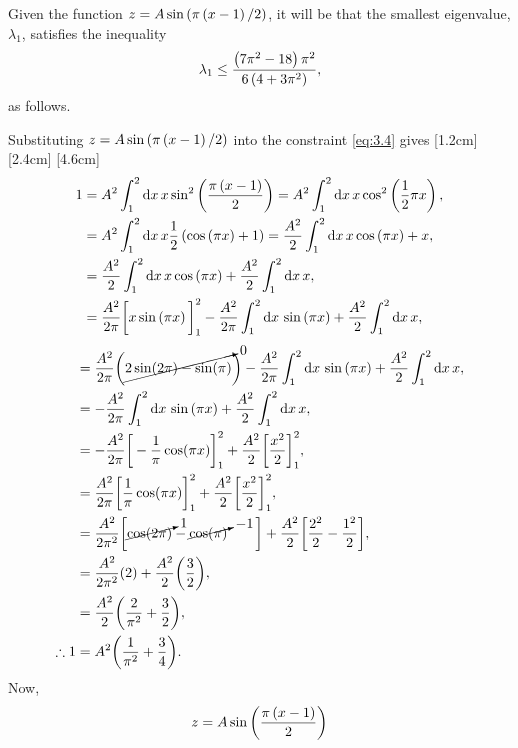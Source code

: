 Given the function $z=A\sin\left(\pi\left(x-1\right)/2\right)$, it will be that the smallest eigenvalue, $\lambda_1$, satisfies the inequality
\[
	\lambda_1\leq \frac{\left(7\pi^2-18\right)\pi^2}{6\left(4+3\pi^2\right)},
\]
as follows.

Substituting $z=A\sin\left(\pi\left(x-1\right)/2\right)$ into the constraint \eqref{eq:3.4} gives
[1.2cm]
[2.4cm]
[4.6cm]
\begin{align*}
	1 &= A^2\int_{1}^{2}\mathrm{d} x\, x \sin^2\left(\frac{\pi\left(x-1\right)}{2}\right)
	= A^2\int_{1}^{2}\mathrm{d} x\, x\cos^2\left(\frac{1}{2}\pi x\right),\nonumber\\
	&= A^2\int_{1}^{2}\mathrm{d} x\, x \frac{1}{2}\left(\cos\left(\pi x\right) + 1\right) = \frac{A^2}{2}\int_{1}^{2}\mathrm{d} x\, x\cos\left(\pi x\right) + x,\nonumber\\
	&= \frac{A^2}{2}\int_{1}^{2}\mathrm{d} x\, x\cos\left(\pi x\right) + \frac{A^2}{2}\int_{1}^{2}\mathrm{d} x\, x,\nonumber\\
	&= \frac{A^2}{2\pi}\bigg[x\sin\left(\pi x\right)\bigg]_1^2 - \frac{A^2}{2\pi}\int_{1}^{2}\mathrm{d} x\,\sin\left(\pi x\right) + \frac{A^2}{2}\int_{1}^{2}\mathrm{d} x\, x,\nonumber\\
\end{align*}
\begin{align}
	&=\frac{A^2}{2\pi}\bigg(\cancelto{0}{2\sin(2\pi) - \sin(\pi)}\bigg)- \frac{A^2}{2\pi}\int_{1}^{2}\mathrm{d} x\,\sin\left(\pi x\right) + \frac{A^2}{2}\int_{1}^{2}\mathrm{d} x\, x,\nonumber\\
	&=-\frac{A^2}{2\pi}\int_{1}^{2}\mathrm{d} x\,\sin\left(\pi x\right) + \frac{A^2}{2}\int_{1}^{2}\mathrm{d} x\, x,\nonumber\\
	&=-\frac{A^2}{2\pi}\bigg[-\frac{1}{\pi}\cos(\pi x)\bigg]_1^2 + \frac{A^2}{2}\bigg[\frac{x^2}{2}\bigg]_1^2,\nonumber\\
	&= \frac{A^2}{2\pi}\bigg[\frac{1}{\pi}\cos(\pi x)\bigg]_1^2 + \frac{A^2}{2}\bigg[\frac{x^2}{2}\bigg]_1^2,\nonumber\\
	&= \frac{A^2}{2\pi^2}\bigg[\cancelto{1}{\cos(2\pi)}-\cancelto{-1}{\cos(\pi)}\quad\quad\bigg] + \frac{A^2}{2}\bigg[\frac{2^2}{2}-\frac{1^2}{2}\bigg],\nonumber\\
	&= \frac{A^2}{2\pi^2}(2)+ \frac{A^2}{2}\bigg(\frac{3}{2}\bigg),\nonumber\\
	&= \frac{A^2}{2}\bigg(\frac{2}{\pi^2}+\frac{3}{2}\bigg),\nonumber\\
		\label{eq:3.6}
	\therefore 1&= A^2\bigg(\frac{1}{\pi^2}+\frac{3}{4}\bigg).
\end{align}
Now,
\[
	z=A\sin\left(\frac{\pi\left(x-1\right)}{2}\right)
\]
